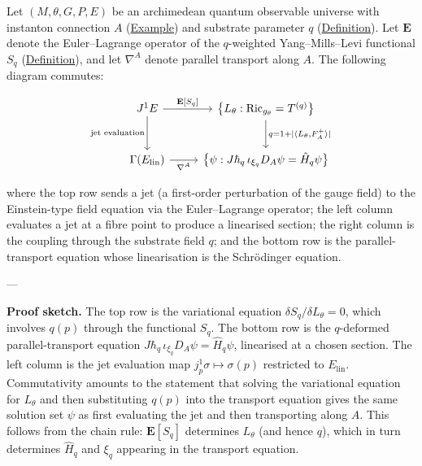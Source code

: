 \begin{proposition}
  \label{prop:main-commutative-diagram}
Let $(M, \theta, G, P, E)$ be an archimedean quantum observable universe
with instanton connection $A$ (\hyperref[ex:instanton]{Example}) and substrate
parameter $q$ (\hyperref[def:substrate-parameter]{Definition}).  Let
$\mathbf{E}$ denote the Euler--Lagrange operator of the
$q$-weighted Yang--Mills--Levi functional $S_q$
(\hyperref[def:q-yang-mills-levi]{Definition}), and let $\nabla^A$ denote
parallel transport along $A$.  The following diagram commutes:

\[
\begin{tikzcd}[row sep=2.5em, column sep=2.5em]
  J^1E
    \ar[r, "{\mathbf{E}[S_q]}"]
    \ar[d, "\text{jet evaluation}"']
  & \bigl\{ L_\theta : \mathrm{Ric}_{g_\theta} = T^{(q)} \bigr\}
    \ar[d, "{q = 1 + \lvert\langle L_\theta, F_A^+\rangle\rvert}"]
  \\
  \Gamma(E_{\mathrm{lin}})
    \ar[r, "\nabla^A"']
  & \bigl\{ \psi : J\hbar_q\,\iota_{\xi_q}D_A\psi = \hat{H}_q\psi \bigr\}
\end{tikzcd}
\]

where the top row sends a jet (a first-order perturbation of the gauge field)
to the Einstein-type field equation via the Euler--Lagrange operator; the
left column evaluates a jet at a fibre point to produce a linearised section;
the right column is the coupling through the substrate field $q$; and the
bottom row is the parallel-transport equation whose linearisation is the
Schrödinger equation.

---

\textbf{Proof sketch.}
The top row is the variational equation $\delta S_q / \delta L_\theta = 0$,
which involves $q(p)$ through the functional $S_q$.  The bottom row is the
$q$-deformed parallel-transport equation
$J\hbar_q\,\iota_{\xi_q}D_A\psi = \hat{H}_q\psi$,
linearised at a chosen section.
The left column is the jet evaluation map
$j^1_p \sigma \mapsto \sigma(p)$ restricted to $E_{\mathrm{lin}}$.
Commutativity amounts to the statement that solving the variational
equation for $L_\theta$ and then substituting $q(p)$ into the transport
equation gives the same solution set $\psi$ as first evaluating the jet
and then transporting along $A$.  This follows from the chain rule:
$\mathbf{E}[S_q]$ determines $L_\theta$ (and hence $q$), which in turn
determines $\hat{H}_q$ and $\xi_q$ appearing in the transport equation.
\end{proposition}
